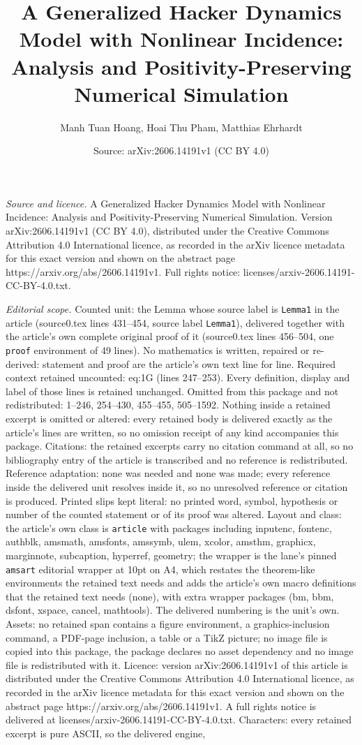 \documentclass[10pt,a4paper]{amsart}
\title[A Generalized Hacker Dynamics Model with Nonlinear Incidence]{A Generalized Hacker Dynamics Model with Nonlinear Incidence: Analysis and Positivity-Preserving Numerical Simulation}
\author{Manh Tuan Hoang, Hoai Thu Pham, Matthias Ehrhardt}
\date{Source: arXiv:2606.14191v1 (CC BY 4.0)}
\begin{document}
\maketitle

\noindent\emph{Source and licence.} A Generalized Hacker Dynamics Model with Nonlinear Incidence: Analysis and Positivity-Preserving Numerical Simulation. Version arXiv:2606.14191v1 (CC BY 4.0), distributed under the Creative Commons Attribution 4.0 International licence, as recorded in the arXiv licence metadata for this exact version and shown on the abstract page https://arxiv.org/abs/2606.14191v1. Full rights notice: licenses/arxiv-2606.14191-CC-BY-4.0.txt.\par\smallskip

\noindent\textit{Editorial scope.} Counted unit: the Lemma whose source label is \texttt{Lemma1} in the article (source0.tex lines 431--454, source label \texttt{Lemma1}), delivered together with the article's own complete original proof of it (source0.tex lines 456--504, one \texttt{proof} environment of 49 lines). No mathematics is written, repaired or re-derived: statement and proof are the article's own text line for line. Required context retained uncounted: eq:1G (lines 247--253). Every definition, display and label of those lines is retained unchanged. Omitted from this package and not redistributed: 1--246, 254--430, 455--455, 505--1592. Nothing inside a retained excerpt is omitted or altered: every retained body is delivered exactly as the article's lines are written, so no omission receipt of any kind accompanies this package. Citations: the retained excerpts carry no citation command at all, so no bibliography entry of the article is transcribed and no reference is redistributed. Reference adaptation: none was needed and none was made; every reference inside the delivered unit resolves inside it, so no unresolved reference or citation is produced. Printed slips kept literal: no printed word, symbol, hypothesis or number of the counted statement or of its proof was altered. Layout and class: the article's own class is \texttt{article} with packages including inputenc, fontenc, authblk, amsmath, amsfonts, amssymb, ulem, xcolor, amsthm, graphicx, marginnote, subcaption, hyperref, geometry; the wrapper is the lane's pinned \texttt{amsart} editorial wrapper at 10pt on A4, which restates the theorem-like environments the retained text needs and adds the article's own macro definitions that the retained text needs (none), with extra wrapper packages (bm, bbm, dsfont, xspace, cancel, mathtools). The delivered numbering is the unit's own. Assets: no retained span contains a figure environment, a graphics-inclusion command, a PDF-page inclusion, a table or a TikZ picture; no image file is copied into this package, the package declares no asset dependency and no image file is redistributed with it. Licence: version arXiv:2606.14191v1 of this article is distributed under the Creative Commons Attribution 4.0 International licence, as recorded in the arXiv licence metadata for this exact version and shown on the abstract page https://arxiv.org/abs/2606.14191v1. A full rights notice is delivered at licenses/arxiv-2606.14191-CC-BY-4.0.txt. Characters: every retained excerpt is pure ASCII, so the delivered engine, 
\end{document}
